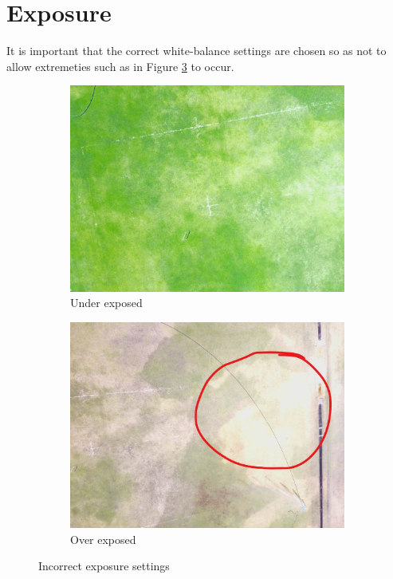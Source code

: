 
\section{Exposure}

It is important that the correct white-balance settings are chosen so as not to allow extremeties such as in Figure \ref{fig:exposure} to occur.

\begin{figure}[H]
\begin{subfigure}{0.5\textwidth}
\centering
\includegraphics[scale=0.17]{images/under-exposed.jpg}
\caption{Under exposed}
\label{fig:under_exposed}
\end{subfigure}
\begin{subfigure}{0.5\textwidth}
\centering
\includegraphics[scale=0.17]{images/over-exposed.jpg}
\caption{Over exposed}
\label{fig:over_exposed}
\end{subfigure}
\caption{Incorrect exposure settings}
\label{fig:exposure}
\end{figure}

